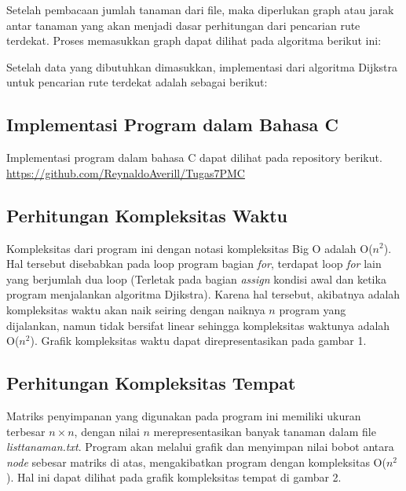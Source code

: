 \documentclass[conference]{IEEEtran}
\begin{document}
Setelah pembacaan jumlah tanaman dari file, maka diperlukan graph atau jarak antar tanaman yang akan menjadi dasar
perhitungan dari pencarian rute terdekat. Proses memasukkan
graph dapat dilihat pada algoritma berikut ini:

Setelah data yang dibutuhkan dimasukkan, implementasi
dari algoritma Dijkstra untuk pencarian rute terdekat adalah
sebagai berikut:

	\subsection{Implementasi Program dalam Bahasa C}
	Implementasi program dalam bahasa C dapat dilihat
pada repository berikut. \url{https://github.com/ReynaldoAverill/Tugas7PMC}

	\subsection{Perhitungan Kompleksitas Waktu}
Kompleksitas dari program ini dengan notasi kompleksitas
Big O adalah O(\begin{math} n^2 \end{math}). Hal tersebut disebabkan pada loop
program bagian \textit{for}, terdapat loop \textit{for} lain yang berjumlah
dua loop (Terletak pada bagian \textit{assign} kondisi awal dan ketika
program menjalankan algoritma Djikstra). Karena hal tersebut,
akibatnya adalah kompleksitas waktu akan naik seiring dengan
naiknya \begin{math} n \end{math} program yang dijalankan, namun tidak bersifat
linear sehingga kompleksitas waktunya adalah O(\begin{math} n^2 \end{math}). Grafik
kompleksitas waktu dapat direpresentasikan pada gambar 1.

	\subsection{ Perhitungan Kompleksitas Tempat}
Matriks penyimpanan yang digunakan pada program ini
memiliki ukuran terbesar \begin{math} n \times n \end{math}, dengan nilai \begin{math} n \end{math} merepresentasikan banyak tanaman dalam file \textit{listtanaman.txt}. Program
akan melalui grafik dan menyimpan nilai bobot antara \textit{node}
sebesar matriks di atas, mengakibatkan program dengan kompleksitas O(\begin{math} n^2 \end{math}). Hal ini dapat dilihat pada grafik kompleksitas
tempat di gambar 2.
\end{document}
